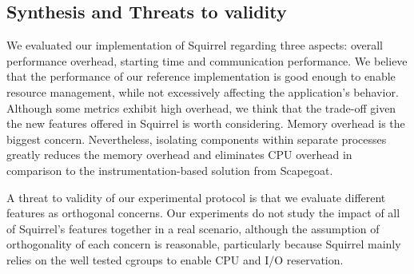 \subsection{Synthesis and Threats to validity} \label{sec:synthesis-evaluation}
We evaluated our implementation of Squirrel regarding three aspects: overall performance overhead, starting time and communication performance.
We believe that the performance of our reference implementation is good enough to enable resource management, while not excessively affecting the application's behavior.  
Although some metrics exhibit high overhead, we think that the trade-off
given the new features offered in Squirrel is 
worth considering. %
Memory overhead is the biggest concern. %
Nevertheless, isolating components within separate processes greatly reduces the memory overhead and eliminates CPU overhead in comparison to the instrumentation-based solution from Scapegoat.

A threat to validity of our experimental protocol is that we evaluate different features as orthogonal concerns. %
Our experiments do not study the impact of all of Squirrel's features together in a real scenario, although the assumption of orthogonality of each concern is reasonable, particularly because Squirrel mainly relies on the well tested cgroups to enable CPU and I/O reservation. 

